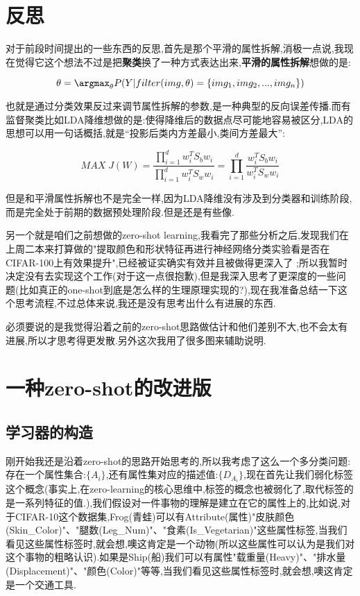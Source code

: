 \section{反思}
对于前段时间提出的一些东西的反思,首先是那个平滑的属性拆解,消极一点说,我现在觉得它这个想法不过是把\textbf{聚类}换了一种方式表达出来,\textbf{平滑的属性拆解}想做的是:

$$\theta = \argmax_{\theta} P(Y | filter(img,\theta)=\{img_1,img_2,...,img_n\})$$

也就是通过分类效果反过来调节属性拆解的参数,是一种典型的反向误差传播.而有监督聚类比如LDA降维想做的是:使得降维后的数据点尽可能地容易被区分,LDA的思想可以用一句话概括,就是“投影后类内方差最小,类间方差最大”:

$$MAX \; J(W) = \frac{\prod\limits_{i=1}^dw_i^TS_bw_i}{\prod\limits_{i=1}^dw_i^TS_ww_i} = \prod\limits_{i=1}^d\frac{w_i^TS_bw_i}{w_i^TS_ww_i}$$

但是和平滑属性拆解也不是完全一样,因为LDA降维没有涉及到分类器和训练阶段,而是完全处于前期的数据预处理阶段.但是还是有些像.

另一个就是咱们之前想做的zero-shot learning,我看完了那些分析之后,发现我们在上周二本来打算做的"提取颜色和形状特征再进行神经网络分类实验看是否在CIFAR-100上有效果提升",已经被证实确实有效并且被做得更深入了\cite{A2} \cite{A2};所以我暂时决定没有去实现这个工作(对于这一点很抱歉),但是我深入思考了更深度的一些问题(比如真正的one-shot到底是怎么样的生理原理实现的?),现在我准备总结一下这个思考流程,不过总体来说,我还是没有思考出什么有进展的东西.

必须要说的是我觉得沿着之前的zero-shot思路做估计和他们差别不大,也不会太有进展,所以才思考得更发散.另外这次我用了很多图来辅助说明.

\section{一种zero-shot的改进版}
\subsection{学习器的构造}
刚开始我还是沿着zero-shot的思路开始思考的,所以我考虑了这么一个多分类问题:存在一个属性集合:$\{A_i\}$,还有属性集对应的描述值:$\{D_{A_i}\}$,现在首先让我们弱化标签这个概念(事实上,在zero-learning的核心思维中,标签的概念也被弱化了,取代标签的是一系列特征的值.),我们假设对一件事物的理解是建立在它的属性上的,比如说,对于CIFAR-10这个数据集,Frog(青蛙)可以有Attribute(属性)"皮肤颜色(Skin_Color)"、"腿数(Leg_Num)"、"食素(Is_Vegetarian)"这些属性标签,当我们看见这些属性标签时,就会想,噢这肯定是一个动物(所以这些属性可以认为是我们对这个事物的粗略认识).如果是Ship(船)我们可以有属性"载重量(Heavy)"、"排水量(Displacement)"、"颜色(Color)"等等,当我们看见这些属性标签时,就会想,噢这肯定是一个交通工具.

